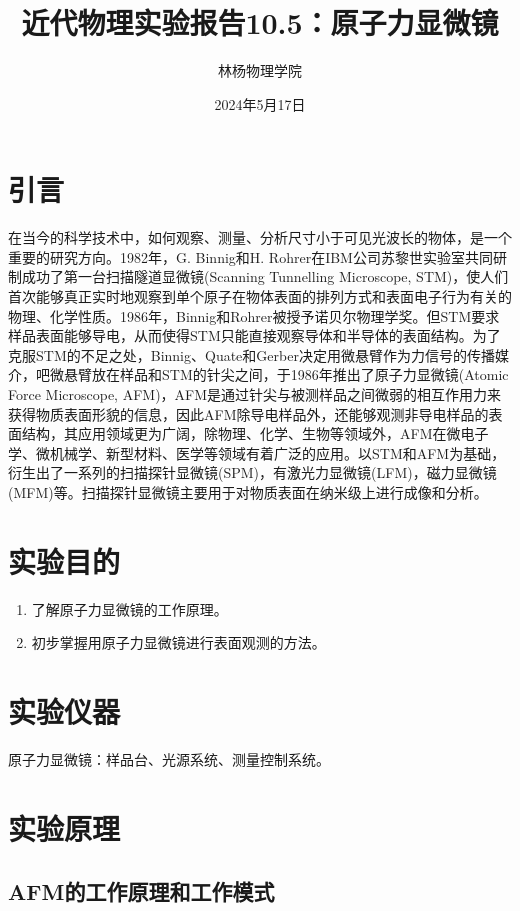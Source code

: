 \documentclass[a4paper]{article}
\title{近代物理实验报告10.5：原子力显微镜}
\author{林杨\quad 211840092\quad 物理学院}
\date{2024年5月17日}
\begin{document}
\maketitle

\tableofcontents

\newpage



\section{引言}
在当今的科学技术中，如何观察、测量、分析尺寸小于可见光波长的物体，是一个重要的研究方向。1982年，G. Binnig和H. Rohrer在IBM公司苏黎世实验室共同研制成功了第一台扫描隧道显微镜(Scanning Tunnelling Microscope, STM)，使人们首次能够真正实时地观察到单个原子在物体表面的排列方式和表面电子行为有关的物理、化学性质。1986年，Binnig和Rohrer被授予诺贝尔物理学奖。但STM要求样品表面能够导电，从而使得STM只能直接观察导体和半导体的表面结构。为了克服STM的不足之处，Binnig、Quate和Gerber决定用微悬臂作为力信号的传播媒介，吧微悬臂放在样品和STM的针尖之间，于1986年推出了原子力显微镜(Atomic Force Microscope, AFM)，AFM是通过针尖与被测样品之间微弱的相互作用力来获得物质表面形貌的信息，因此AFM除导电样品外，还能够观测非导电样品的表面结构，其应用领域更为广阔，除物理、化学、生物等领域外，AFM在微电子学、微机械学、新型材料、医学等领域有着广泛的应用。以STM和AFM为基础，衍生出了一系列的扫描探针显微镜(SPM)，有激光力显微镜(LFM)，磁力显微镜(MFM)等。扫描探针显微镜主要用于对物质表面在纳米级上进行成像和分析。

\section{实验目的}
\begin{enumerate}
\item 了解原子力显微镜的工作原理。
\item 初步掌握用原子力显微镜进行表面观测的方法。
\end{enumerate}

\section{实验仪器}
原子力显微镜：样品台、光源系统、测量控制系统。

\section{实验原理}
\subsection{AFM的工作原理和工作模式}
\end{document}
